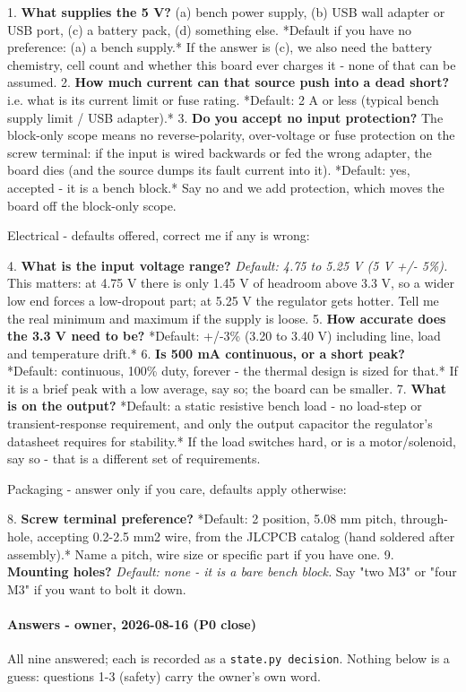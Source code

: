 \documentclass[11pt,a4paper]{article}
\begin{document}
1. \textbf{What supplies the 5 V?} (a) bench power supply, (b) USB wall adapter or USB port, (c) a battery pack, (d) something else. {*}Default if you have no preference: (a) a bench supply.{*} If the answer is (c), we also need the battery chemistry, cell count and whether this board ever charges it - none of that can be assumed. 2. \textbf{How much current can that source push into a dead short?} i.e. what is its current limit or fuse rating. {*}Default: 2 A or less (typical bench supply limit / USB adapter).{*} 3. \textbf{Do you accept no input protection?} The block-only scope means no reverse-polarity, over-voltage or fuse protection on the screw terminal: if the input is wired backwards or fed the wrong adapter, the board dies (and the source dumps its fault current into it). {*}Default: yes, accepted - it is a bench block.{*} Say no and we add protection, which moves the board off the block-only scope.

Electrical - defaults offered, correct me if any is wrong:

4. \textbf{What is the input voltage range?} \emph{Default: 4.75 to 5.25 V (5 V +/- 5\%).} This matters: at 4.75 V there is only 1.45 V of headroom above 3.3 V, so a wider low end forces a low-dropout part; at 5.25 V the regulator gets hotter. Tell me the real minimum and maximum if the supply is loose. 5. \textbf{How accurate does the 3.3 V need to be?} {*}Default: +/-3\% (3.20 to 3.40 V) including line, load and temperature drift.{*} 6. \textbf{Is 500 mA continuous, or a short peak?} {*}Default: continuous, 100\% duty, forever - the thermal design is sized for that.{*} If it is a brief peak with a low average, say so; the board can be smaller. 7. \textbf{What is on the output?} {*}Default: a static resistive bench load - no load-step or transient-response requirement, and only the output capacitor the regulator's datasheet requires for stability.{*} If the load switches hard, or is a motor/solenoid, say so - that is a different set of requirements.

Packaging - answer only if you care, defaults apply otherwise:

8. \textbf{Screw terminal preference?} {*}Default: 2 position, 5.08 mm pitch, through-hole, accepting 0.2-2.5 mm2 wire, from the JLCPCB catalog (hand soldered after assembly).{*} Name a pitch, wire size or specific part if you have one. 9. \textbf{Mounting holes?} \emph{Default: none - it is a bare bench block.} Say "two M3" or "four M3" if you want to bolt it down.

\paragraph*{Answers - owner, 2026-08-16 (P0 close)}
All nine answered; each is recorded as a \texttt{state.py decision}. Nothing below is a guess: questions 1-3 (safety) carry the owner's own word.
\end{document}
